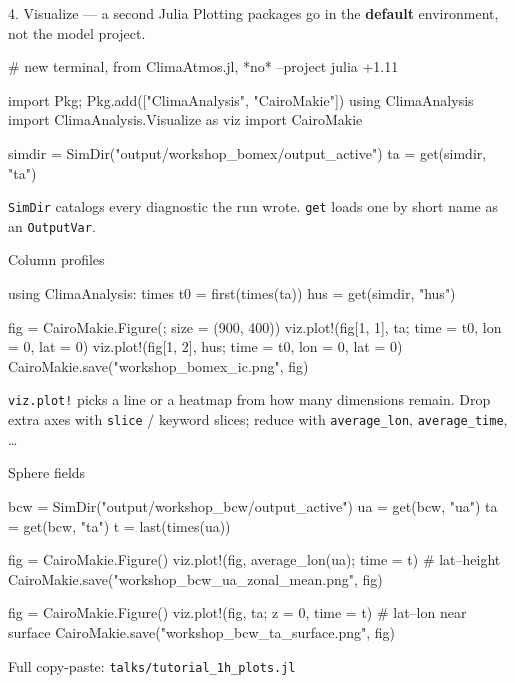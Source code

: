 \documentclass[aspectratio=169,11pt]{beamer}
\newcommand{\cta}[1]{{\color{climateal}\textbf{#1}}}
\begin{document}
\begin{frame}[fragile]{4. Visualize --- a second Julia}
Plotting packages go in the \cta{default} environment, not the model project.
\vspace{0.3em}
\begin{semiverbatim}
# new terminal, from ClimaAtmos.jl, *no* --project
julia +1.11
\end{semiverbatim}
\begin{semiverbatim}
import Pkg; Pkg.add(["ClimaAnalysis", "CairoMakie"])
using ClimaAnalysis
import ClimaAnalysis.Visualize as viz
import CairoMakie

simdir = SimDir("output/workshop_bomex/output_active")
ta = get(simdir, "ta")
\end{semiverbatim}
\small
\texttt{SimDir} catalogs every diagnostic the run wrote. \texttt{get} loads
one by short name as an \texttt{OutputVar}.
\end{frame}

\begin{frame}[fragile]{Column profiles}
\begin{semiverbatim}
using ClimaAnalysis: times
t0 = first(times(ta))
hus = get(simdir, "hus")

fig = CairoMakie.Figure(; size = (900, 400))
viz.plot!(fig[1, 1], ta;  time = t0, lon = 0, lat = 0)
viz.plot!(fig[1, 2], hus; time = t0, lon = 0, lat = 0)
CairoMakie.save("workshop_bomex_ic.png", fig)
\end{semiverbatim}
\vspace{0.4em}
\texttt{viz.plot!} picks a line or a heatmap from how many dimensions remain.
Drop extra axes with \texttt{slice} / keyword slices; reduce with
\texttt{average\_lon}, \texttt{average\_time}, \ldots
\end{frame}

\begin{frame}[fragile]{Sphere fields}
\begin{semiverbatim}
bcw = SimDir("output/workshop_bcw/output_active")
ua = get(bcw, "ua")
ta = get(bcw, "ta")
t = last(times(ua))

fig = CairoMakie.Figure()
viz.plot!(fig, average_lon(ua); time = t)   # lat--height
CairoMakie.save("workshop_bcw_ua_zonal_mean.png", fig)

fig = CairoMakie.Figure()
viz.plot!(fig, ta; z = 0, time = t)         # lat--lon near surface
CairoMakie.save("workshop_bcw_ta_surface.png", fig)
\end{semiverbatim}
\small
Full copy-paste: \texttt{talks/tutorial\_1h\_plots.jl}
\end{frame}
\end{document}
